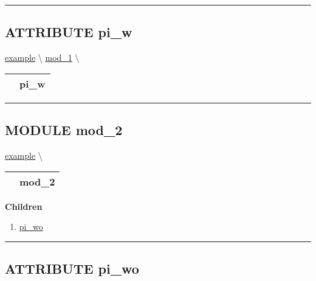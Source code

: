 \rule{\linewidth}{0.5pt}

\subsection*{\textsf{\colorbox{headtoc}{\color{white} ATTRIBUTE}
pi\_w}}

\hypertarget{ecldoc:example.mod_1.pi_w}{}
\hspace{0pt} \hyperlink{ecldoc:example}{example} \textbackslash 
\hspace{0pt} \hyperlink{ecldoc:example.mod_1}{mod_1} \textbackslash 

{\renewcommand{\arraystretch}{1.5}
\begin{tabularx}{\textwidth}{|>{\raggedright\arraybackslash}l|X|}
\hline
\hspace{0pt}\mytexttt{\color{red} } & \textbf{pi\_w} \\
\hline
\end{tabularx}
}

\par


\rule{\linewidth}{0.5pt}


\subsection*{\textsf{\colorbox{headtoc}{\color{white} MODULE}
mod\_2}}

\hypertarget{ecldoc:example.mod_2}{}
\hspace{0pt} \hyperlink{ecldoc:example}{example} \textbackslash 

{\renewcommand{\arraystretch}{1.5}
\begin{tabularx}{\textwidth}{|>{\raggedright\arraybackslash}l|X|}
\hline
\hspace{0pt}\mytexttt{\color{red} } & \textbf{mod\_2} \\
\hline
\end{tabularx}
}

\par


\textbf{Children}
\begin{enumerate}
\item \hyperlink{ecldoc:example.mod_2.pi_wo}{pi\_wo}
\end{enumerate}

\rule{\linewidth}{0.5pt}

\subsection*{\textsf{\colorbox{headtoc}{\color{white} ATTRIBUTE}
pi\_wo}}

